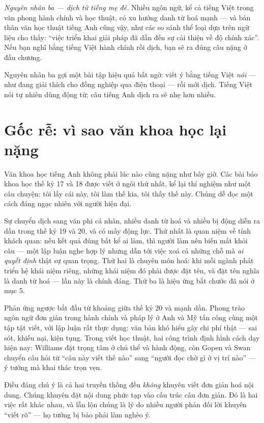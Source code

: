 \documentclass[../../english.tex]{subfiles}
\begin{document}
\emph{Nguyên nhân ba --- dịch từ tiếng mẹ đẻ.} Nhiều ngôn ngữ, kể cả tiếng Việt trong văn phong hành chính và học thuật, có xu hướng danh từ hoá mạnh --- và bản thân văn học thuật tiếng Anh cũng vậy, như các so sánh thể loại dựa trên ngữ liệu cho thấy\cite{biber1999}: ``việc triển khai giải pháp đã dẫn đến sự cải thiện về độ chính xác''. Nếu bạn nghĩ bằng tiếng Việt hành chính rồi dịch, bạn sẽ ra đúng câu nặng ở đầu chương.

Nguyên nhân ba gợi một bài tập hiệu quả bất ngờ: viết ý bằng tiếng Việt \emph{nói} --- như đang giải thích cho đồng nghiệp qua điện thoại --- rồi mới dịch. Tiếng Việt nói tự nhiên dùng động từ; câu tiếng Anh dịch ra sẽ nhẹ hơn nhiều.

\section{Gốc rễ: vì sao văn khoa học lại nặng}

Văn khoa học tiếng Anh không phải lúc nào cũng nặng như bây giờ. Các bài báo khoa học thế kỷ 17 và 18 được viết ở ngôi thứ nhất, kể lại thí nghiệm như một câu chuyện: tôi lấy cái này, tôi làm thế kia, tôi thấy thế này. Chúng dễ đọc một cách đáng ngạc nhiên với người hiện đại.

Sự chuyển dịch sang văn phi cá nhân, nhiều danh từ hoá và nhiều bị động diễn ra dần trong thế kỷ 19 và 20, và có mấy động lực. Thứ nhất là quan niệm về tính khách quan: nếu kết quả đúng bất kể ai làm, thì người làm nên biến mất khỏi câu --- một lập luận nghe hợp lý nhưng dẫn tới việc xoá cả những chỗ mà \emph{ai quyết định} thật sự quan trọng. Thứ hai là chuyên môn hoá: khi mỗi ngành phát triển hệ khái niệm riêng, những khái niệm đó phải được đặt tên, và đặt tên nghĩa là danh từ hoá --- lần này là chính đáng. Thứ ba là hiệu ứng bắt chước đã nói ở mục 5.

Phản ứng ngược bắt đầu từ khoảng giữa thế kỷ 20 và mạnh dần\cite{zinsser2006,pinker2014}. Phong trào ngôn ngữ đơn giản trong hành chính và pháp lý ở Anh và Mỹ tấn công cùng một tập tật viết, với lập luận rất thực dụng: văn bản khó hiểu gây chi phí thật --- sai sót, khiếu nại, kiện tụng. Trong viết học thuật, hai công trình định hình cách dạy hiện nay: Williams đặt trọng tâm ở chủ thể và hành động\cite{williams2016}, còn Gopen và Swan\cite{gopenswan1990} chuyển câu hỏi từ ``câu này viết thế nào'' sang ``người đọc chờ gì ở vị trí nào'' --- ý tưởng mà  khai thác trọn vẹn.

Điều đáng chú ý là cả hai truyền thống đều \emph{không} khuyên viết đơn giản hoá nội dung. Chúng khuyên đặt nội dung phức tạp vào cấu trúc câu đơn giản. Đó là hai việc rất khác nhau, và lẫn lộn chúng là lý do nhiều người phản đối lời khuyên ``viết rõ'' --- họ tưởng bị bảo phải làm nghèo ý.
\end{document}
